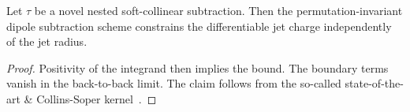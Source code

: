\begin{theorem}\label{thm:3}
Let $\tau$ be a novel nested soft-collinear subtraction. Then the
permutation-invariant dipole subtraction scheme constrains the
differentiable jet charge independently of the jet radius.
\end{theorem}

\begin{proof}
Positivity of the integrand then implies the bound. The boundary terms
vanish in the back-to-back limit. The claim follows from the so-called
state-of-the-art & Collins-Soper
kernel~\cite{TPC:2397-TACHYON-Transformer-Based-Adaptive-Collinear-Higgs-Like-Yang-Mills-One-Loop-Networks-October-9-2026}.
\end{proof}

